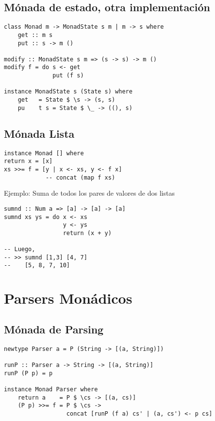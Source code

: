 \documentclass{article}
\begin{document}
\subsection{Mónada de estado, otra implementación}

\begin{lstlisting}
class Monad m -> MonadState s m | m -> s where
    get :: m s
    put :: s -> m ()

modify :: MonadState s m => (s -> s) -> m ()
modify f = do s <- get
              put (f s)

instance MonadState s (State s) where
    get   = State $ \s -> (s, s)
    pu    t s = State $ \_ -> ((), s)
\end{lstlisting}

\subsection{Mónada Lista}

\begin{lstlisting}
instance Monad [] where
return x = [x]
xs >>= f = [y | x <- xs, y <- f x]
            -- concat (map f xs)
\end{lstlisting}

Ejemplo: Suma de todos los pares de valores de dos listas

\begin{lstlisting}
sumnd :: Num a => [a] -> [a] -> [a]
sumnd xs ys = do x <- xs
                 y <- ys
                 return (x + y)
                 
-- Luego, 
-- >> sumnd [1,3] [4, 7]
--    [5, 8, 7, 10]     
\end{lstlisting}

\section{Parsers Monádicos}\label{sec:parsers_monadicos}

\subsection{Mónada de Parsing}

\begin{lstlisting}
newtype Parser a = P (String -> [(a, String)])

runP :: Parser a -> String -> [(a, String)]
runP (P p) = p

instance Monad Parser where
    return a    = P $ \cs -> [(a, cs)]
    (P p) >>= f = P $ \cs ->
                  concat [runP (f a) cs' | (a, cs') <- p cs]
\end{lstlisting}
\end{document}
